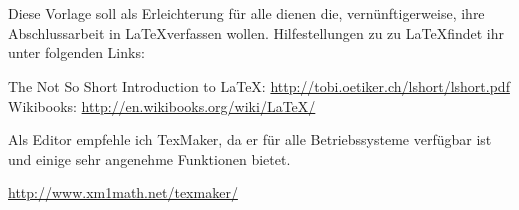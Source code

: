 \chapter*{\abstractname} %
Diese Vorlage soll als Erleichterung für alle dienen die, vernünftigerweise, ihre Abschlussarbeit in \LaTeX verfassen wollen. Hilfestellungen zu zu \LaTeX findet ihr unter folgenden Links:

\begin{center}
The Not So Short Introduction to \LaTeX: \url{http://tobi.oetiker.ch/lshort/lshort.pdf} \\
Wikibooks: \url{http://en.wikibooks.org/wiki/LaTeX/}
\end{center}

Als Editor empfehle ich TexMaker, da er für alle Betriebssysteme verfügbar ist und einige sehr angenehme Funktionen bietet.
\begin{center}\url{http://www.xm1math.net/texmaker/}\end{center}

\newpage